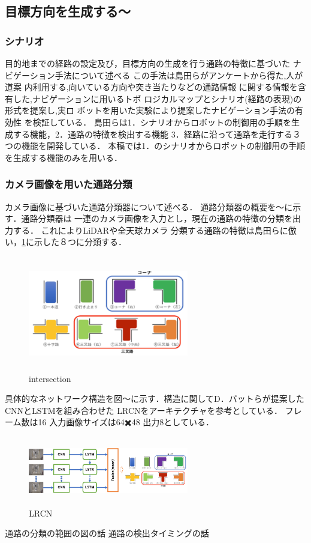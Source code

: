\documentclass{sice-si}
\begin{document}
\subsection{目標方向を生成する〜}
\subsubsection{シナリオ}
目的地までの経路の設定及び，目標方向の生成を行う通路の特徴に基づいた
ナビゲーション手法について述べる
この手法は島田らがアンケートから得た,人が道案
内利用する,向いている方向や突き当たりなどの通路情報
に関する情報を含有した,ナビゲーションに用いるトポ
ロジカルマップとシナリオ(経路の表現)の形式を提案し,実ロ
ボットを用いた実験により提案したナビゲーション手法の有効性
を検証している．
島田らは1．シナリオからロボットの制御用の手順を生成する機能，2．通路の特徴を検出する機能
3．経路に沿って通路を走行する３つの機能を開発している．
本稿では1．のシナリオからロボットの制御用の手順を生成する機能のみを用いる．


\subsubsection{カメラ画像を用いた通路分類}
カメラ画像に基づいた通路分類器について述べる．
通路分類器の概要を〜に示す．通路分類器は
一連のカメラ画像を入力とし，現在の通路の特徴の分類を出力する．
これによりLiDARや全天球カメラ
分類する通路の特徴は島田らに倣い，\ref{fig:intersection}に示した８つに分類する．
\begin{figure}[htbp]
    \begin{center}
    \includegraphics[width=70mm,height=50mm]{./figs/intersection.png}
    \caption{intersection}
    \end{center}
    \label{fig:intersection}
\end{figure}
具体的なネットワーク構造を図〜に示す．構造に関してD．バットらが提案したCNNとLSTMを組み合わせた
LRCNをアーキテクチャを参考としている．
フレーム数は16 入力画像サイズは64✖️48 出力8としている．
\begin{figure}[htbp]
    \begin{center}
    \includegraphics[width=70mm,height=30mm]{./figs/LRCN.png}
    \caption{LRCN}
    \end{center}
    \label{fig:LRCN}
\end{figure}
通路の分類の範囲の図の話
通路の検出タイミングの話
\end{document}
